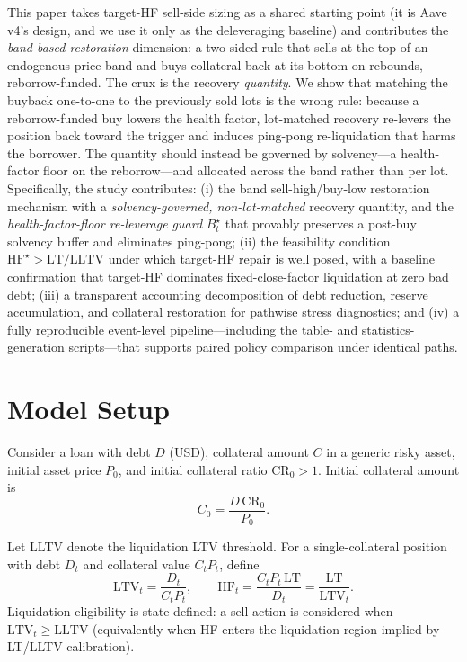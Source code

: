 \documentclass[12pt]{article}
\begin{document}
This paper takes target-HF sell-side sizing as a shared starting point (it is Aave v4's design, and we use it only as the deleveraging baseline) and contributes the \emph{band-based restoration} dimension: a two-sided rule that sells at the top of an endogenous price band and buys collateral back at its bottom on rebounds, reborrow-funded. The crux is the recovery \emph{quantity}. We show that matching the buyback one-to-one to the previously sold lots is the wrong rule: because a reborrow-funded buy lowers the health factor, lot-matched recovery re-levers the position back toward the trigger and induces ping-pong re-liquidation that harms the borrower. The quantity should instead be governed by solvency---a health-factor floor on the reborrow---and allocated across the band rather than per lot. Specifically, the study contributes: (i) the band sell-high/buy-low restoration mechanism with a \emph{solvency-governed, non-lot-matched} recovery quantity, and the \emph{health-factor-floor re-leverage guard} $B_t^{\star}$ that provably preserves a post-buy solvency buffer and eliminates ping-pong; (ii) the feasibility condition $\mathrm{HF}^{\star}>\mathrm{LT}/\mathrm{LLTV}$ under which target-HF repair is well posed, with a baseline confirmation that target-HF dominates fixed-close-factor liquidation at zero bad debt; (iii) a transparent accounting decomposition of debt reduction, reserve accumulation, and collateral restoration for pathwise stress diagnostics; and (iv) a fully reproducible event-level pipeline---including the table- and statistics-generation scripts---that supports paired policy comparison under identical paths.

\section{Model Setup}
Consider a loan with debt $D$ (USD), collateral amount $C$ in a generic risky asset, initial asset price $P_0$, and initial collateral ratio $\mathrm{CR}_0>1$.
Initial collateral amount is
\[
C_0 = \frac{D\,\mathrm{CR}_0}{P_0}.
\]

Let LLTV denote the liquidation LTV threshold. For a single-collateral position with debt $D_t$ and collateral value $C_tP_t$, define
\[
\mathrm{LTV}_t = \frac{D_t}{C_tP_t}, \qquad
\mathrm{HF}_t = \frac{C_tP_t\,\mathrm{LT}}{D_t}=\frac{\mathrm{LT}}{\mathrm{LTV}_t}.
\]
Liquidation eligibility is state-defined: a sell action is considered when $\mathrm{LTV}_t\ge \mathrm{LLTV}$ (equivalently when HF enters the liquidation region implied by LT/LLTV calibration).
\end{document}
